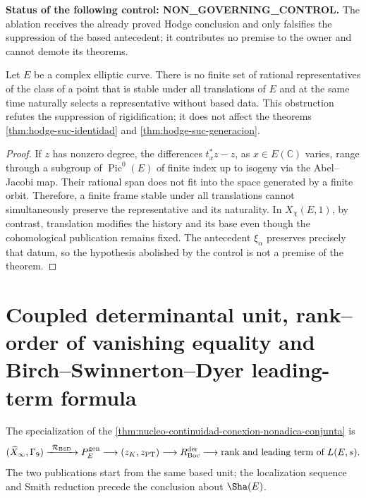 

\noindent\textbf{Status of the following control: NON\_GOVERNING\_CONTROL.}
The ablation receives the already proved Hodge conclusion and only falsifies the
suppression of the based antecedent; it contributes no premise to the owner and
cannot demote its theorems.

\begin{ablation}
\label{abl:hodge-suc-eliptico}
Let \(E\) be a complex elliptic curve. There is no finite set of
rational representatives of the class of a point that is stable under all
translations of \(E\) and at the same time naturally selects a
representative without based data. This obstruction refutes the suppression of
rigidification; it does not affect the theorems
\ref{thm:hodge-suc-identidad} and \ref{thm:hodge-suc-generacion}.
\end{ablation}

\begin{proof}
If \(z\) has nonzero degree, the differences
\(t_x^{*}z-z\), as \(x\in E(\mathbb C)\) varies, range through a subgroup of \(\operatorname{Pic}^{0}(E)\)
of finite index up to isogeny via the Abel--Jacobi
map. Their rational span does not fit into the space
generated by a finite orbit. Therefore, a finite frame stable under all
translations cannot simultaneously preserve the representative and its
naturality. In \(X_{\chi}(E,1)\), by contrast, translation modifies the
history and its base even though the cohomological publication remains fixed. The
antecedent \(\xi_{\alpha}\) preserves precisely that datum, so the
hypothesis abolished by the control is not a premise of the theorem.
\end{proof}
\chapter{Coupled determinantal unit, rank--order of vanishing equality and Birch--Swinnerton--Dyer leading-term formula}

\noindent The specialization of the
\cref{thm:nucleo-continuidad-conexion-nonadica-conjunta} is
\[
 (\widehat X_\infty,\Gamma_9)
 \xrightarrow{\ \mathcal R_{\rm BSD}\ }
 P_E^{\rm gen}
 \longrightarrow(z_K,z_{\rm PT})
 \longrightarrow R_{\rm Boc}^{\rm der}
 \longrightarrow\text{rank and leading term of }L(E,s).
\]
The two publications start from the same based unit; the localization
sequence and Smith reduction precede the conclusion about
\(\Sha(E)\).


